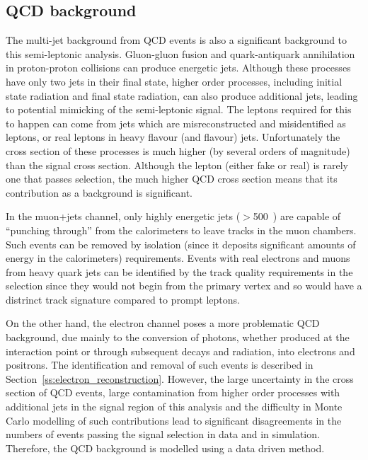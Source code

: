 \subsection{QCD background}
\label{ss:qcd}
The multi-jet background from QCD events is also a significant background to this semi-leptonic \ttbar
analysis. Gluon-gluon fusion and quark-antiquark annihilation in proton-proton collisions can produce
energetic jets. Although these processes have only two jets in their final state, higher order processes,
including initial state radiation and final state radiation, can also produce additional jets, leading to
potential mimicking of the semi-leptonic \ttbar signal. The leptons required for this to happen can come from
jets which are misreconstructed and misidentified as leptons, or real leptons in heavy flavour (\cPqb and
\cPqc flavour) jets. Unfortunately the cross section of these processes is much higher (by several orders of
magnitude) than the signal cross section. Although the lepton (either fake or real) is rarely one that passes
selection, the much higher QCD cross section means that its contribution as a background is significant.

In the muon+jets channel, only highly energetic jets (\pt$>$500~\GeV) are capable of ``punching through''
from the calorimeters to leave tracks in the muon chambers. Such events can be removed by isolation (since it
deposits significant amounts of energy in the calorimeters) requirements. Events with real electrons and muons
from heavy quark jets can be identified by the track quality requirements in the selection since they would
not begin from the primary vertex and so would have a distrinct track signature compared to prompt leptons.

On the other hand, the electron channel poses a more problematic QCD background, due mainly to the conversion
of photons, whether produced at the interaction point or through subsequent decays and radiation, into
electrons and positrons. The identification and removal of such events is described in
Section~\ref{ss:electron_reconstruction}. However, the large uncertainty in the cross section of QCD events,
large contamination from higher order processes with additional jets in the signal region of this analysis and
the difficulty in Monte Carlo modelling of such contributions lead to significant disagreements in the numbers
of events passing the signal selection in data and in simulation. Therefore, the QCD background is modelled
using a data driven method.

